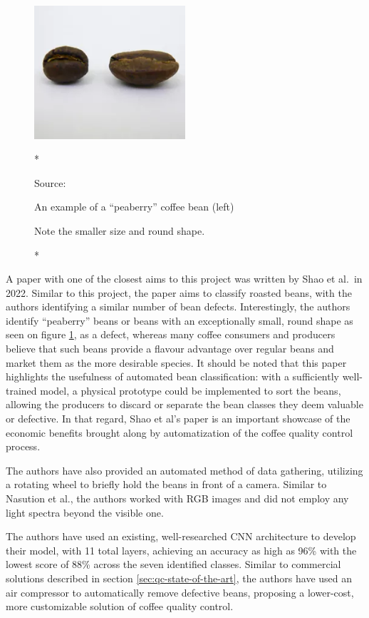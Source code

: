 \begin{figure}
	\includegraphics[width=0.5\textwidth]{figures/litReview/peaberry-vs-normal}
	\caption{*}
	{Source: \cite{peaberryImg}}
	\caption{An example of a ``peaberry'' coffee bean (left)}
	\caption{*}
	{Note the smaller size and round shape.} \label{fig:peaberryComparison}
\end{figure}
A paper with one of the closest aims to this project was written by Shao et al.\ in
2022\cite{rgbDeepLearningShao}. Similar to this project, the paper aims to
classify roasted beans, with the authors identifying a similar number of bean defects.
Interestingly, the authors identify ``peaberry'' beans or beans with an exceptionally
small, round shape as seen on figure \ref{fig:peaberryComparison}, as a defect,
whereas many coffee consumers and producers believe that such beans provide a
flavour advantage over regular beans and market them as the more desirable
species. It should be noted that this paper highlights the usefulness of automated
bean classification: with a sufficiently well-trained model, a physical prototype
could be implemented to sort the beans, allowing the producers to discard or
separate the bean classes they deem valuable or defective. In that regard, Shao
et al's paper is an important showcase of the economic benefits brought along by
automatization of the coffee quality control process.

The authors have also provided an automated method of data gathering, utilizing a
rotating wheel to briefly hold the beans in front of a camera. Similar to
Nasution et al.\cite{manyRoastLevelsNasution}, the authors worked with RGB images
and did not employ any light spectra beyond the visible one.

The authors have used an existing, well-researched CNN architecture to develop
their model, with 11 total layers, achieving an accuracy as high as 96\% with the
lowest score of 88\% across the seven identified classes. Similar to commercial solutions
described in section \ref{sec:qc-state-of-the-art}, the authors have used an air
compressor to automatically remove defective beans, proposing a lower-cost, more
customizable solution of coffee quality control.

